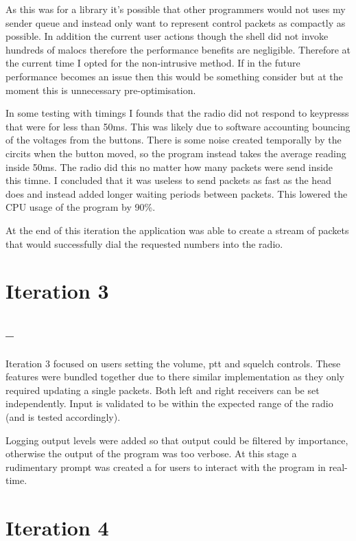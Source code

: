 As this was for a library it's possible that other programmers would not uses my sender queue and instead only want to represent control packets as compactly as possible. In addition the current user actions though the shell did not invoke hundreds of malocs therefore the performance benefits are negligible. Therefore at the current time I opted for the non-intrusive method. If in the future performance becomes an issue then this would be something consider but at the moment this is unnecessary pre-optimisation.

In some testing with timings I founds that the radio did not respond to keypresss that were for less than 50ms. This was likely due to software accounting bouncing of the voltages from the buttons. There is some noise created temporally by the circits when the button moved, so the program instead takes the average reading inside 50ms. The radio did this no matter how many packets were send inside this timne. I concluded that it was useless to send packets as fast as the head does and instead added longer waiting periods between packets. This lowered the CPU usage of the program by 90\%.

At the end of this iteration the application was able to create a stream of packets that would successfully dial the requested numbers into the radio. 

\section{Iteration 3}
\subsection*{ -- }
Iteration 3 focused on users setting the volume, \gls{ptt} and \gls{squelch} controls. These features were bundled together due to there similar implementation as they only required updating a single packets. Both left and right receivers can be set independently. Input is validated to be within the expected range of the radio (and is tested accordingly).

Logging output levels were added so that output could be filtered by importance, otherwise the output of the program was too verbose. At this stage a rudimentary prompt was created a for users to interact with the program in real-time. 

\section{Iteration 4}
